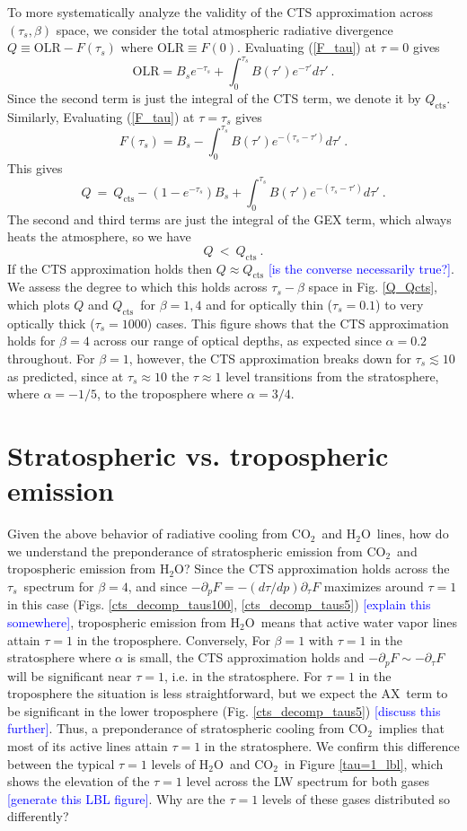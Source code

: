 \documentclass[10pt]{article}
\newcommand{\comment}[1]{\textcolor{blue}{[{#1}]}}
\newcommand{\beqn}{\begin{equation}}
\newcommand{\eeqn}{\end{equation}}
\newcommand{\eqnref}[1]{(\ref{#1})}
\newcommand{\ppp}{\ensuremath{\partial_p}}
\newcommand{\pptau}{\ensuremath{\partial_\tau}}
\newcommand{\cotwo}{\ensuremath{\mathrm{CO_2}}}
\newcommand{\htwo}{\ensuremath{\mathrm{H_2O}}}
\newcommand{\Qcts}{\ensuremath{Q_\mathrm{cts}}}
\newcommand{\OLR}{\ensuremath{\mathrm{OLR}}}
\newcommand{\taus}{\ensuremath{\tau_s}}
\newcommand{\Bs}{\ensuremath{B_s}}
\newcommand{\AX}{\ensuremath{\mathrm{AX}}}
\begin{document}
To more systematically analyze  the validity of the CTS approximation across $(\taus,\beta)$ space, we consider the total atmospheric radiative divergence $Q \equiv \OLR-F(\taus)$ where $\OLR\equiv F(0)$. Evaluating \eqnref{F_tau} at $\tau=0$ gives
\beqn
	\OLR = \Bs e^{-\taus} + \int_0^{\taus} B(\tau') e^{-\tau'} d\tau' \ .
\eeqn
Since the second term is just the integral of the CTS term, we denote it by \Qcts. Similarly,  Evaluating \eqnref{F_tau} at $\tau=\taus$ gives
\beqn
	F(\taus) = \Bs  - \int_0^{\taus} B(\tau') e^{-(\taus-\tau')} d\tau' \ .
\eeqn
This gives
\beqn
	Q \ = \ \Qcts - (1-e^{-\taus})\Bs  + \int_0^{\taus} B(\tau') e^{-(\taus-\tau')} d\tau' \ .
\eeqn
The second and third terms are just the integral of the GEX term, which always heats the atmosphere, so we have
\beqn
	Q \ <\  \Qcts \ .
\eeqn
If the CTS approximation holds then $Q \approx \Qcts$ \comment{is the converse necessarily true?}.  We assess the degree to which this holds across $\taus-\beta$ space in Fig. \ref{Q_Qcts}, which plots $Q$ and \Qcts\ for $\beta=1,4$ and for optically thin ($\taus = 0.1$) to very optically thick ($\taus=1000$) cases. This figure shows that the CTS approximation holds for $\beta=4$ across our range of optical depths, as expected since $\alpha = 0.2$ throughout. For $\beta=1$, however, the CTS approximation breaks down for $\taus \lesssim 10$ as predicted, since at $\taus \approx 10$ the $\tau \approx 1$ level transitions from the stratosphere, where $\alpha = -1/5$, to the  troposphere where $\alpha = 3/4$.

\section{Stratospheric vs. tropospheric emission}
Given the above behavior of radiative cooling from  \cotwo\ and \htwo\ lines, how do we understand the preponderance of stratospheric emission from \cotwo\ and tropospheric emission from \htwo? Since the CTS approximation holds across the \taus\ spectrum for $\beta=4$, and since $-\ppp F = - (d\tau/dp)\pptau F$ maximizes around $\tau=1$ in this case (Figs. \ref{cts_decomp_taus100}, \ref{cts_decomp_taus5}) \comment{explain this somewhere}, tropospheric emission from \htwo\  means that active water vapor lines attain $\tau=1$ in the troposphere. Conversely,  For $\beta=1$ with $\tau=1$ in the stratosphere where $\alpha$ is small, the CTS approximation holds and $-\ppp F \sim -\pptau F$ will be significant near $\tau=1$, i.e. in the stratosphere. For  $\tau=1$ in the troposphere the situation is less straightforward, but we expect the \AX\ term to be significant in the lower troposphere (Fig. \ref{cts_decomp_taus5}) \comment{discuss this further}. Thus, a preponderance of stratospheric cooling from \cotwo\ implies that most of its active lines attain $\tau=1$ in the stratosphere. We confirm this difference between the typical $\tau=1$ levels of \htwo\ and \cotwo\ in Figure \ref{tau=1_lbl}, which shows the elevation of the $\tau=1$ level across the LW spectrum for both gases \comment{generate this LBL figure}. Why are the $\tau=1$ levels of these gases distributed so differently?
\end{document}
